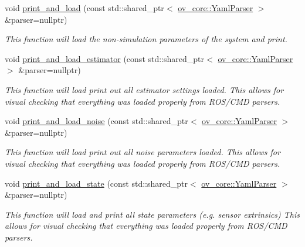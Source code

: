 \begin{DoxyCompactItemize}
\item 
void \hyperlink{structov__msckf_1_1VioManagerOptions_a47c23046d8d14887345655c41086a6be}{print\+\_\+and\+\_\+load} (const std\+::shared\+\_\+ptr$<$ \hyperlink{classov__core_1_1YamlParser}{ov\+\_\+core\+::\+Yaml\+Parser} $>$ \&parser=nullptr)
\begin{DoxyCompactList}\small\item\em This function will load the non-\/simulation parameters of the system and print. \end{DoxyCompactList}\item 
void \hyperlink{structov__msckf_1_1VioManagerOptions_a2881476b186ab8998e3e53a1c786d064}{print\+\_\+and\+\_\+load\+\_\+estimator} (const std\+::shared\+\_\+ptr$<$ \hyperlink{classov__core_1_1YamlParser}{ov\+\_\+core\+::\+Yaml\+Parser} $>$ \&parser=nullptr)
\begin{DoxyCompactList}\small\item\em This function will load print out all estimator settings loaded. This allows for visual checking that everything was loaded properly from R\+O\+S/\+C\+MD parsers. \end{DoxyCompactList}\item 
void \hyperlink{structov__msckf_1_1VioManagerOptions_a8b6747bbaa472ee1b1ecb790e480162c}{print\+\_\+and\+\_\+load\+\_\+noise} (const std\+::shared\+\_\+ptr$<$ \hyperlink{classov__core_1_1YamlParser}{ov\+\_\+core\+::\+Yaml\+Parser} $>$ \&parser=nullptr)
\begin{DoxyCompactList}\small\item\em This function will load print out all noise parameters loaded. This allows for visual checking that everything was loaded properly from R\+O\+S/\+C\+MD parsers. \end{DoxyCompactList}\item 
void \hyperlink{structov__msckf_1_1VioManagerOptions_a36f57d2065478652ae129ec538c1b98e}{print\+\_\+and\+\_\+load\+\_\+state} (const std\+::shared\+\_\+ptr$<$ \hyperlink{classov__core_1_1YamlParser}{ov\+\_\+core\+::\+Yaml\+Parser} $>$ \&parser=nullptr)
\begin{DoxyCompactList}\small\item\em This function will load and print all state parameters (e.\+g. sensor extrinsics) This allows for visual checking that everything was loaded properly from R\+O\+S/\+C\+MD parsers. \end{DoxyCompactList}\item 

\end{DoxyCompactItemize}
